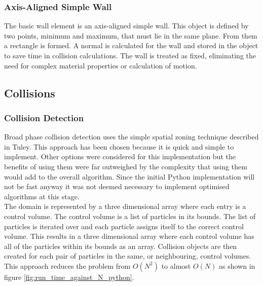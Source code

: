 \documentclass[10pt,a4paper,titlepage]{report}
\begin{document}
\subsubsection{Axis-Aligned Simple Wall}
The basic wall element is an axis-aligned simple wall. This object is defined by two points, minimum and maximum, that must lie in the same plane. From them a rectangle is formed. A normal is calculated for the wall and stored in the object to save time in collision calculations. The wall is treated as fixed, eliminating the need for complex material properties or calculation of motion.
\subsection{Collisions}
\subsubsection{Collision Detection}
\label{sec:Python Collision Detection}
Broad phase collision detection uses the simple spatial zoning technique described in Tuley\cite{tuley}. This approach has been chosen because it is quick and simple to implement. Other options were considered for this implementation but the benefits of using them were far outweighed by the complexity that using them would add to the overall algorithm. Since the initial Python implementation will not be fast anyway it was not deemed necessary to implement optimised algorithms at this stage.
\\The domain is represented by a three dimensional array where each entry is a control volume. The control volume is a list of particles in its bounds. The list of particles is iterated over and each particle assigns itself to the correct control volume. This results in a three dimensional array where each control volume has all of the particles within its bounds as an array. Collision objects are then created for each pair of particles in the same, or neighbouring, control volumes. This approach reduces the problem from $O(N^{2})$ to almost $O(N)$ as shown in figure \ref{fig:run_time_against_N_python}.
\end{document}
